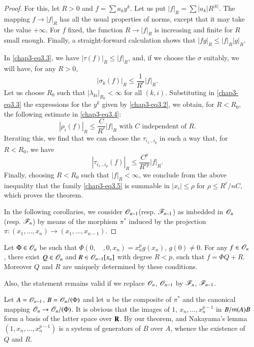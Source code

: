 \begin{proof}
For this, let $R>0$ and $f=\sum a_{k}y^{k}$. Let us put $|f|_{R}=\sum | a_{k} |R^{|k|}$. The mapping $f\to |f|_{R}$ has all the usual properties of norms, except that it may take the value $+\infty$. For $f$ fixed, the function $R\to |f|_{R}$ is increasing and finite for $R$ small enough. Finally, a straight-forward calculation shows that $|fg|_{R}\leq |f|_{R}|g|_{R}$.

In \eqref{chap3-eq3.3}, we have $|\tau (f)|_{R}\leq |f|_{R}$, and, if we choose the $\sigma$ suitably, we will have, for any $R>0$,
$$
|\sigma_{k}(f)|_{R}\leq \dfrac{1}{R^{r}}|f|_{R}.
$$
Let us choose $R_{0}$ such that $|\lambda_{ki}|_{R_{0}}<\infty$ for all $(k,i)$. Substituting in \eqref{chap3-eq3.3} the expressions for the $y^{k}$ given by \eqref{chap3-eq3.2}, we obtain, for $R<R_{0}$, the following estimate in \eqref{chap3-eq3.4}:
$$
|\rho_{i}(f)|_{R}\leq \dfrac{C}{R^{r}}|f|_{R}\text{ with $C$ independent of $R$.}
$$\pageoriginale
Iterating this, we find that we can choose the $\tau_{i_{1}\ldots i_{p}}$ in such a way that, for $R<R_{0}$, we have
$$
|\tau_{i_{1}\ldots i_{p}}(f)|_{R}\leq \dfrac{C^{p}}{R^{rp}}|f|_{R}.
$$
Finally, choosing $R<R_{0}$ such that $|f|_{R}<\infty$, we conclude from the above inequality that the family \eqref{chap3-eq3.5} is summable in $|x_{i}|\leq \rho$ for $\rho\leq R^{r}/nC$, which proves the theorem.

In the following corollaries, we consider $\mathscr{O}_{n-1}$(resp. $\mathscr{F}_{n-1}$) as imbedded in $\mathscr{O}_{n}$ (resp. $\mathscr{F}_{n}$) by means of the morphism $\pi^{*}$ induced by the projection $\pi:(x_{1},\ldots,x_{n})\to (x_{1},\ldots,x_{n-1})$.
\end{proof}

\setcounter{theorem}{5}
\begin{corollary}\label{chap3-coro3.6}
Let $\Phi\in \mathscr{O}_{n}$ be such that $\Phi(0,\quad,0,x_{n})=x^{p}_{n}g(x_{n})$, $g(0)\neq 0$. For any $f\in \mathscr{O}_{n}$, there exist $Q\in \mathscr{O}_{n}$ and $R\in \mathscr{O}_{n-1}[x_{n}]$ with degree $R<p$, such that $f=\Phi Q+R$. Moreover $Q$ and $R$ are uniquely determined by these conditions.

Also, the statement remains valid if we replace $\mathscr{O}_{n}$, $\mathscr{O}_{n-1}$ by $\mathscr{F}_{n}$, $\mathscr{F}_{n-1}$.
\end{corollary}

Let $A=\mathscr{O}_{n-1}$, $B=\mathscr{O}_{n}/(\Phi)$ and let $u$ be the composite of $\pi^{*}$ and the canonical mapping $\mathscr{O}_{n}\to \mathscr{O}_{n}/(\Phi)$. It is obvious that the images of $1$, $x_{n},\ldots,x^{p-1}_{n}$ in $B/\mathfrak{m}(A)B$ form a basis of the latter space over $\mathbf{R}$. By our theorem, and Nakayama's lemma $(1,x_{n},\ldots,x^{p-1}_{n})$ is a system of generators of $B$ over $A$, whence the existence of $Q$ and $R$.


